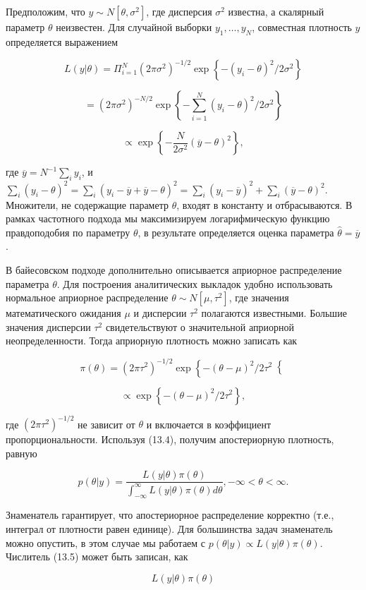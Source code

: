 Предположим, что $y{\sim}N[\theta,\sigma^{2}]$, где дисперсия $\sigma^{2}$ известна, а скалярный параметр $\theta$ неизвестен. Для случайной выборки $y_1,\ldots ,y_N$, совместная плотность $y$ определяется выражением

\[
L(y|\theta)=\Pi^{N}_{i=1}(2\pi\sigma^{2})^{-1/2}\exp\left\lbrace -(y_i-\theta)^{2}/2\sigma^{2}\right\rbrace 
\]

\[
=(2\pi\sigma^{2})^{-N/2}\exp\left\lbrace-\sum^{N}_{i=1}(y_i-\theta)^{2}/2\sigma^{2}\right\rbrace
\]

\[
\propto{\exp}\left\lbrace-\frac{N}{2\sigma^{2}}(\overline{y}-\theta)^{2}\right\rbrace,
\]

где $\overline{y}=N^{-1}\sum_{i}y_i$, и $\sum_{i}(y_i-\theta)^{2}=\sum_{i}(y_i-\overline{y}+\overline{y}-\theta)^{2}=\sum_{i}(y_i-\overline{y})^{2}+\sum_{i}(\overline{y}-\theta)^{2}$. Множители, не содержащие параметр $\theta$, входят в константу и отбрасываются. В рамках частотного подхода мы максимизируем  логарифмическую функцию правдоподобия по параметру $\theta$, в результате определяется  оценка параметра $\hat{\theta}=\overline{y}$.

В байесовском подходе дополнительно описывается априорное распределение параметра $\theta$. Для построения аналитических выкладок удобно использовать нормальное априорное распределение $\theta{\sim}N[\mu,\tau^{2}]$, где значения математического ожидания $\mu$ и дисперсии $\tau^{2}$ полагаются известными. Большие значения дисперсии $\tau^{2}$ свидетельствуют о значительной априорной неопределенности. Тогда априорную плотность можно записать как

\[
\pi(\theta)=(2\pi\tau^{2})^{-1/2}\exp\left\lbrace-(\theta-\mu)^{2}/2\tau^{2}\right\lbrace
\]

\[
\propto{\exp}\left\lbrace-(\theta-\mu)^{2}/2\tau^{2}\right\rbrace,
\]

где $(2\pi\tau^{2})^{-1/2}$ не зависит от $\theta$ и включается в коэффициент пропорциональности. Используя (13.4), получим апостериорную плотность, равную

\[
p(\theta|y)=\frac{L(y|\theta)\pi(\theta)}{\int^{\infty}_{-\infty}L(y|\theta)\pi(\theta)d\theta}, -\infty<\theta<\infty.
\]

Знаменатель гарантирует, что апостериорное распределение корректно (т.е., интеграл от плотности равен единице). Для большинства задач знаменатель можно опустить, в этом случае мы работаем с $p(\theta|y)\propto{L(y|\theta)\pi(\theta)}$. Числитель (13.5) может быть записан, как

\[
L(y|\theta)\pi(\theta)
\]


